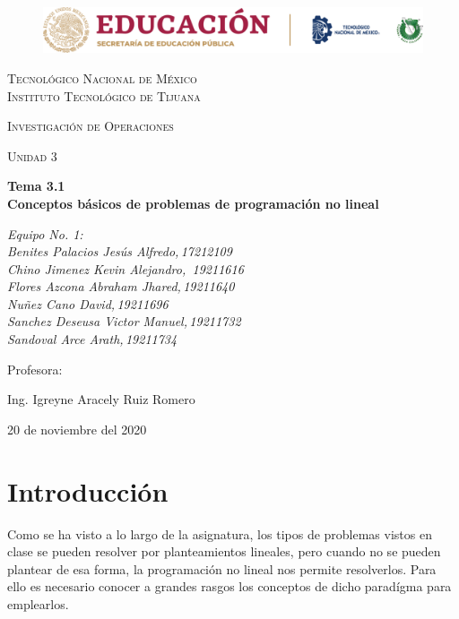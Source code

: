 \documentclass[letterpaper, 12pt]{article}
\begin{document}
    
    \begin{titlepage}
        \begin{figure}[ht]
            \centering
            \includegraphics[width=15cm]{logosITT.png}
        \end{figure}
        \centering
        {\scshape\LARGE Tecnológico Nacional de México\\Instituto Tecnológico de Tijuana\par}
        \vspace{1cm}
        {\scshape\Large Investigación de Operaciones\par}
        \vspace{1cm}
        {\scshape\Large Unidad 3\par}
        \vspace{1.5cm}
        {\huge\bfseries Tema 3.1\\Conceptos básicos de problemas de programación no lineal\par}
        \vspace{2cm}
        {\Large\itshape Equipo No. 1:\\Benites Palacios Jesús Alfredo,\,17212109\\Chino Jimenez Kevin Alejandro,\, 19211616\\Flores Azcona Abraham Jhared,\,19211640\\Nuñez Cano David,\,19211696\\Sanchez Deseusa Victor Manuel,\,19211732\\Sandoval Arce Arath,\,19211734\par}
        \vfill
        Profesora: \par
        Ing. Igreyne Aracely Ruiz Romero
        
        \vfill

        {\large 20 de noviembre del 2020}
    \end{titlepage}

    \newpage
    \thispagestyle{empty}
    \tableofcontents
    \listoffigures

    \newpage
    \section{Introducción}
    Como se ha visto a lo largo de la asignatura, los tipos de problemas vistos en clase se pueden resolver por planteamientos lineales, pero cuando no se pueden plantear de esa forma, la programación no lineal nos permite resolverlos. Para ello es necesario conocer a grandes rasgos
    los conceptos de dicho paradígma para emplearlos.
\end{document}
